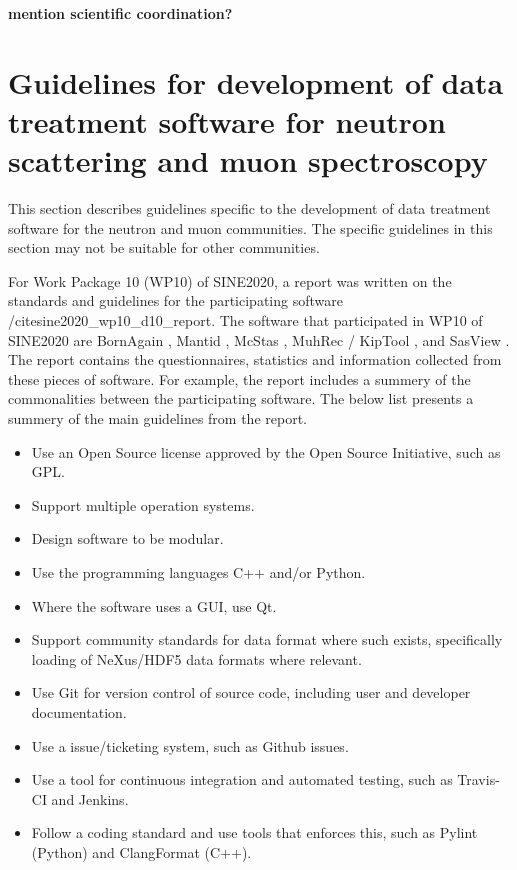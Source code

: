 \documentclass[jnr]{iosart2x}
\newcommand{\todo}[1]{\textbf{#1}}
\begin{document}
\todo{mention scientific coordination?}

\section{Guidelines for development of data treatment software for neutron scattering and muon spectroscopy}
\label{SINE2020}

This section describes guidelines specific to the development of data treatment software for the neutron and muon communities.
The specific guidelines in this section may not be suitable for other communities.

For Work Package 10 (WP10) of SINE2020, a report was written on the standards and guidelines for the participating software /cite{sine2020_wp10_d10_report}. 
The software that participated in WP10 of SINE2020 are BornAgain \cite{bornagain}, Mantid \cite{mantid}, McStas \cite{mcstats}, MuhRec / KipTool \cite{ImagingSuite}, and SasView \cite{sasview}.
The report contains the questionnaires, statistics and information collected from these pieces of software.
For example, the report includes a summery of the commonalities between the participating software.
The below list presents a summery of the main guidelines from the report. 

\begin{itemize}
      \item Use an Open Source license approved by the Open Source Initiative, such as GPL.
      \item Support multiple operation systems.
      \item Design software to be modular.
      \item Use the programming languages C++ and/or Python.
      \item Where the software uses a GUI, use Qt.
      \item Support community standards for data format where such exists, specifically loading of NeXus/HDF5 data formats where relevant.
      \item Use Git for version control of source code, including user and developer documentation.
      \item Use a issue/ticketing system, such as Github issues.
      \item Use a tool for continuous integration and automated testing, such as Travis-CI and Jenkins.
      \item Follow a coding standard and use tools that enforces this, such as Pylint (Python) and ClangFormat (C++).
\end{itemize}
\end{document}

